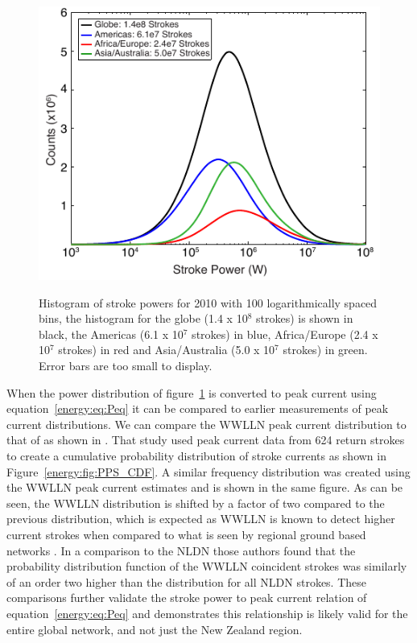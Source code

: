 \begin{figure}[ht!]
\centering
\includegraphics[scale=1]{energy/Figures/PPS_Distribution2.pdf}\\
\caption{Histogram of stroke powers for 2010 with 100 logarithmically spaced bins, the histogram for the globe (1.4 x 10$^8$ strokes) is shown in black, the Americas (6.1 x 10$^7$ strokes) in blue, Africa/Europe (2.4 x 10$^7$ strokes) in red and Asia/Australia (5.0 x 10$^7$ strokes) in green. Error bars are too small to display.}
\label{energy:fig:distribution}
\end{figure}
 
When the power distribution of figure~\ref{energy:fig:distribution} is converted to peak current using equation~\ref{energy:eq:Peq} it can be compared to earlier measurements of peak current distributions.
We can compare the WWLLN peak current distribution to that of \citet{Popolansky1972} as shown in \citet{Golde1977}.
That study used peak current data from 624 return strokes to create a cumulative probability distribution of stroke currents as shown in Figure~\ref{energy:fig:PPS_CDF}.
A similar frequency distribution was created using the WWLLN peak current estimates and is shown in the same figure.
As can be seen, the WWLLN distribution is shifted by a factor of two compared to the previous distribution, which is expected as WWLLN is known to detect higher current strokes when compared to what is seen by regional ground based networks \citep{Abarca2010}.
In a comparison to the NLDN those authors found that the probability distribution function of the WWLLN coincident strokes was similarly of an order two higher than the distribution for all NLDN strokes.
These comparisons further validate the stroke power to peak current relation of equation~\ref{energy:eq:Peq} and demonstrates this relationship is likely valid for the entire global network, and not just the New Zealand region.

